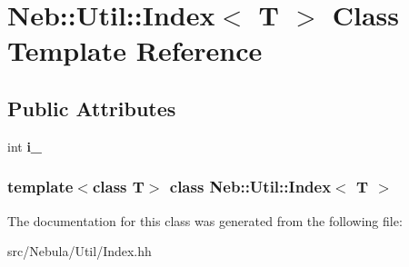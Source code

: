 \hypertarget{classNeb_1_1Util_1_1Index}{\section{\-Neb\-:\-:\-Util\-:\-:\-Index$<$ \-T $>$ \-Class \-Template \-Reference}
\label{classNeb_1_1Util_1_1Index}
}
\subsection*{\-Public \-Attributes}
\begin{DoxyCompactItemize}
\item 
\hypertarget{classNeb_1_1Util_1_1Index_a182cd10c2e05283a292b846931daf43b}{int {\bfseries i\-\_\-}}\label{classNeb_1_1Util_1_1Index_a182cd10c2e05283a292b846931daf43b}

\end{DoxyCompactItemize}
\subsubsection*{template$<$class T$>$ class Neb\-::\-Util\-::\-Index$<$ T $>$}



\-The documentation for this class was generated from the following file\-:\begin{DoxyCompactItemize}
\item 
src/\-Nebula/\-Util/\-Index.\-hh\end{DoxyCompactItemize}
